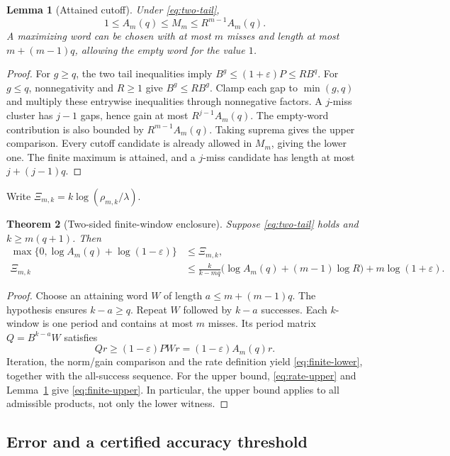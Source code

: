 \documentclass[11pt,letterpaper]{article}
\newtheorem{theorem}{Theorem}
\newtheorem{lemma}[theorem]{Lemma}
\theoremstyle{remark}
\begin{document}
\begin{lemma}[Attained cutoff]\label{lem:cutoff}
Under \eqref{eq:two-tail},
\[
 1\le A_m(q)\le M_m\le R^{m-1}A_m(q).
\]
A maximizing word can be chosen with at most $m$ misses and length at most
$m+(m-1)q$, allowing the empty word for the value $1$.
\end{lemma}
\begin{proof}
For $g\ge q$, the two tail inequalities imply
$B^g\le(1+\varepsilon)P\le R B^q$. For $g\le q$, nonnegativity and
$R\ge1$ give $B^g\le RB^g$. Clamp each gap to $\min(g,q)$ and multiply
these entrywise inequalities through nonnegative factors. A $j$-miss
cluster has $j-1$ gaps, hence gain at most $R^{j-1}A_m(q)$.
The empty-word contribution is also bounded by $R^{m-1}A_m(q)$.
Taking suprema gives the upper comparison. Every cutoff candidate is
already allowed in $M_m$, giving the lower one. The finite maximum is
attained, and a $j$-miss candidate has length at most $j+(j-1)q$.
\end{proof}

Write $\Xi_{m,k}=k\log(\rho_{m,k}/\lambda)$.
\begin{theorem}[Two-sided finite-window enclosure]\label{thm:finite}
Suppose \eqref{eq:two-tail} holds and $k\ge m(q+1)$. Then
\begin{align}
 \max\{0,\log A_m(q)+\log(1-\varepsilon)\}
 &\le\Xi_{m,k},\label{eq:finite-lower}\\
 \Xi_{m,k}&\le
 \frac{k}{k-mq}\bigl(\log A_m(q)+(m-1)\log R\bigr)
       +m\log(1+\varepsilon).\label{eq:finite-upper}
\end{align}
\end{theorem}
\begin{proof}
Choose an attaining word $W$ of length $a\le m+(m-1)q$. The hypothesis
ensures $k-a\ge q$. Repeat $W$ followed by $k-a$ successes. Each
$k$-window is one period and contains at most $m$ misses. Its period
matrix $Q=B^{k-a}W$ satisfies
\[
 Qr\ge(1-\varepsilon)PWr=(1-\varepsilon)A_m(q)r.
\]
Iteration, the norm/gain comparison and the rate definition yield
\eqref{eq:finite-lower}, together with the all-success sequence.
For the upper bound, \eqref{eq:rate-upper} and Lemma~\ref{lem:cutoff}
give \eqref{eq:finite-upper}. In particular, the upper bound applies to
all admissible products, not only the lower witness.
\end{proof}

\subsection{Error and a certified accuracy threshold}
\end{document}
